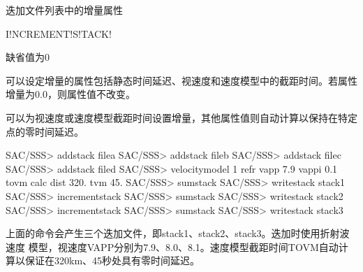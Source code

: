 \label{sss:incrementstack}

迭加文件列表中的增量属性

\begin{SACSTX}
    I!NCREMENT!S!TACK!
\end{SACSTX}


缺省值为0

可以设定增量的属性包括静态时间延迟、视速度和速度模型中的截距时间。若属性
增量为0.0，则属性值不改变。

可以为视速度或速度模型截距时间设置增量，其他属性值则自动计算以保持在特定点的零时间延迟。

\begin{SACCode}
SAC/SSS> addstack filea
SAC/SSS> addstack fileb
SAC/SSS> addstack filec
SAC/SSS> addstack filed
SAC/SSS> velocitymodel 1 refr vapp 7.9 vappi 0.1 tovm calc dist 320. tvm 45.
SAC/SSS> sumstack
SAC/SSS> writestack stack1
SAC/SSS> incrementstack
SAC/SSS> sumstack
SAC/SSS> writestack stack2
SAC/SSS> incrementstack
SAC/SSS> sumstack
SAC/SSS> writestack stack3
\end{SACCode}

上面的命令会产生三个迭加文件，即stack1、stack2、stack3。迭加时使用折射波速度
模型，视速度VAPP分别为7.9、8.0、8.1。速度模型截距时间TOVM自动计算以保证在320km、45秒处具有零时间延迟。

